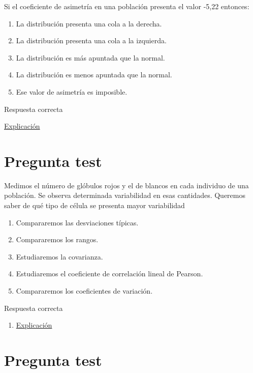 \documentclass[
]{book}
\providecommand{\tightlist}{%
  \setlength{\itemsep}{0pt}\setlength{\parskip}{0pt}}
\begin{document}
Si el coeficiente de asimetría en una población presenta el valor -5,22 entonces:

\begin{enumerate}
\def\labelenumi{\alph{enumi})}
\tightlist
\item
  La distribución presenta una cola a la derecha.
\item
  La distribución presenta una cola a la izquierda.
\item
  La distribución es más apuntada que la normal.
\item
  La distribución es menos apuntada que la normal.
\item
  Ese valor de asimetría es imposible.
\end{enumerate}

Respuesta correcta

\href{https://1fjmanzano.github.io/bioestadistica/medidas-de-forma.html}{Explicación}

\hypertarget{pregunta-test-81}{%
\section{Pregunta test}\label{pregunta-test-81}}

Medimos el número de glóbulos rojos y el de blancos en cada individuo de una población. Se observa determinada variabilidad en esas cantidades. Queremos saber de qué tipo de célula se presenta mayor variabilidad

\begin{enumerate}
\def\labelenumi{\alph{enumi})}
\tightlist
\item
  Compararemos las desviaciones típicas.
\item
  Compararemos los rangos.
\item
  Estudiaremos la covarianza.
\item
  Estudiaremos el coeficiente de correlación lineal de Pearson.
\item
  Compararemos los coeficientes de variación.
\end{enumerate}

Respuesta correcta

\begin{enumerate}
\def\labelenumi{\alph{enumi})}
\setcounter{enumi}{4}
\tightlist
\item
  \href{https://en.wikipedia.org/wiki/Coefficient_of_variation}{Explicación}
\end{enumerate}

\hypertarget{pregunta-test-82}{%
\section{Pregunta test}\label{pregunta-test-82}}
\end{document}
